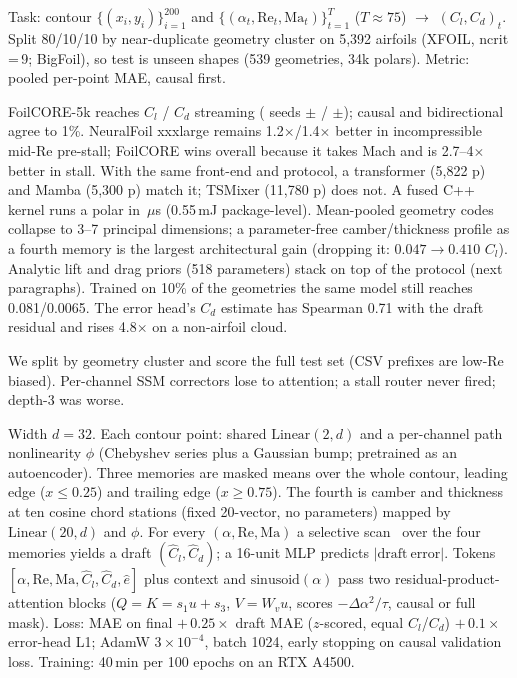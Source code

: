 \documentclass{article}
\begin{document}
\begin{table}[t]
\centering\footnotesize
\caption{Held-out-geometry test (34,043 polars). Causal AR unless marked. NeuralFoil on a 1,024-polar subset. Latency: $T{=}68$, one CPU thread.}
\label{tab:main}
\setlength{\tabcolsep}{2.0pt}

\end{table}

Task: contour $\{(x_i,y_i)\}_{i=1}^{200}$ and $\{(\alpha_t,\mathrm{Re}_t,\mathrm{Ma}_t)\}_{t=1}^{T}$ ($T\approx 75$) $\rightarrow$ $(C_l,C_d)_t$. Split 80/10/10 by near-duplicate geometry cluster on 5,392 airfoils (XFOIL, ncrit\,=\,9; BigFoil), so test is unseen shapes (539 geometries, 34k polars). Metric: pooled per-point MAE, causal first.

FoilCORE-5k reaches \MainClAR{} $C_l$ / \MainCdAR{} $C_d$ streaming (\SeedN{} seeds \SeedClMean$\pm$\SeedClStd{} / \SeedCdMean$\pm$\SeedCdStd); causal and bidirectional agree to 1\%. NeuralFoil xxxlarge remains 1.2$\times$/1.4$\times$ better in incompressible mid-Re pre-stall; FoilCORE wins overall because it takes Mach and is 2.7--4$\times$ better in stall. With the same front-end and protocol, a transformer (5,822 p) and Mamba (5,300 p) match it; TSMixer (11,780 p) does not. A fused C++ kernel runs a polar in \MainFusedUs\,$\mu$s (0.55\,mJ package-level). Mean-pooled geometry codes collapse to 3--7 principal dimensions; a parameter-free camber/thickness profile as a fourth memory is the largest architectural gain (dropping it: $0.047\rightarrow 0.410$ $C_l$). Analytic lift and drag priors (518 parameters) stack on top of the protocol (next paragraphs). Trained on 10\% of the geometries the same model still reaches 0.081/0.0065. The error head's $C_d$ estimate has Spearman 0.71 with the draft residual and rises 4.8$\times$ on a non-airfoil cloud.

We split by geometry cluster and score the full test set (CSV prefixes are low-Re biased). Per-channel SSM correctors lose to attention; a stall router never fired; depth-3 was worse.

Width $d{=}32$. Each contour point: shared $\mathrm{Linear}(2,d)$ and a per-channel path nonlinearity $\phi$ (Chebyshev series plus a Gaussian bump; pretrained as an autoencoder). Three memories are masked means over the whole contour, leading edge ($x\le 0.25$) and trailing edge ($x\ge 0.75$). The fourth is camber and thickness at ten cosine chord stations (fixed 20-vector, no parameters) mapped by $\mathrm{Linear}(20,d)$ and $\phi$. For every $(\alpha,\mathrm{Re},\mathrm{Ma})$ a selective scan~\citep{gu2024mamba,gu2022s4} over the four memories yields a draft $(\hat C_l,\hat C_d)$; a 16-unit MLP predicts $|\mathrm{draft\ error}|$. Tokens $[\alpha,\mathrm{Re},\mathrm{Ma},\hat C_l,\hat C_d,\hat e]$ plus context and $\mathrm{sinusoid}(\alpha)$ pass two residual-product-attention blocks ($Q{=}K{=}s_1 u+s_3$, $V{=}W_v u$, scores $-\Delta\alpha^2/\tau$, causal or full mask). Loss: MAE on final $+\,0.25\times$ draft MAE ($z$-scored, equal $C_l$/$C_d$) $+\,0.1\times$ error-head L1; AdamW $3\times10^{-4}$, batch 1024, early stopping on causal validation loss. Training: 40\,min per 100 epochs on an RTX A4500.
\end{document}
